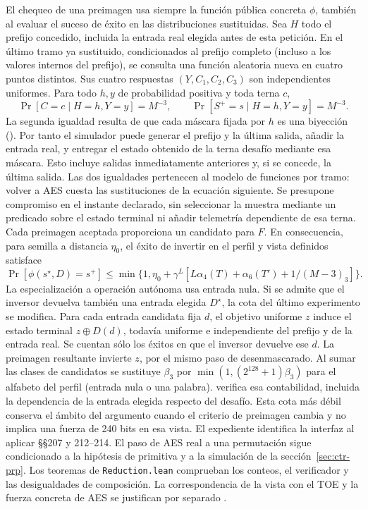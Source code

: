 El chequeo de una preimagen usa siempre la función pública concreta
\(\phi\), también al evaluar el suceso de éxito en las distribuciones
sustituidas. Sea \(H\) todo el prefijo concedido, incluida la entrada real
elegida antes de esta petición. En el último tramo ya sustituido,
condicionados al prefijo completo (incluso a los valores internos del
prefijo), se consulta una función aleatoria nueva en cuatro puntos
distintos. Sus cuatro respuestas \((Y,C_1,C_2,C_3)\) son independientes
uniformes. Para todo \(h,y\) de probabilidad positiva y toda terna \(c\),
\[
 \Pr[C=c\mid H=h,Y=y]=M^{-3},\qquad
 \Pr[S^+=s\mid H=h,Y=y]=M^{-3}.
\]
La segunda igualdad resulta de que cada máscara fijada por \(h\) es una
biyección (). Por tanto el simulador puede
generar el prefijo y la última salida, añadir la entrada real, y entregar el
estado obtenido de la terna desafío mediante esa máscara. Esto incluye
salidas inmediatamente anteriores y, si se concede, la última salida. Las
dos igualdades pertenecen al modelo de funciones por tramo: volver a AES
cuesta las sustituciones de la ecuación siguiente. Se presupone compromiso
en el instante declarado, sin seleccionar la muestra mediante un predicado
sobre el estado terminal ni añadir telemetría dependiente de esa terna.
Cada preimagen aceptada proporciona un candidato para \(F\).
En consecuencia, para semilla a distancia \(\eta_0\), el éxito de
invertir en el perfil y vista definidos satisface
\[
 \Pr[\phi(s^\star,D)=s^+]
 \le \min\{1,\eta_0+\gamma^L[L\alpha_4(T)
                     +\alpha_6(T')+1/(M-3)_3]\}.
\]
La especialización a operación autónoma usa entrada nula. Si se admite que el inversor devuelva también una entrada elegida
\(D^\star\), la cota del último experimento se modifica. Para cada entrada
candidata fija \(d\), el objetivo uniforme \(z\) induce el estado terminal
\(z\oplus D(d)\), todavía uniforme e independiente del prefijo y de la
entrada real. Se cuentan sólo los éxitos en que el inversor devuelve
ese \(d\). La preimagen resultante invierte \(z\), por el mismo paso de
desenmascarado. Al sumar las clases de candidatos se sustituye
\(\beta_3\) por \(\min(1,(2^{128}+1)\beta_3)\) para el alfabeto del perfil
(entrada nula o una palabra).  verifica esa
contabilidad, incluida la dependencia de la entrada elegida respecto del
desafío. Esta cota más débil conserva el ámbito del argumento cuando el
criterio de preimagen cambia y no implica una fuerza de 240 bits en esa
vista. El expediente identifica la interfaz al aplicar §§207 y 212--214. El paso de AES real a una permutación
sigue condicionado a la hipótesis de primitiva y a la simulación de la
sección~\ref{sec:ctr-prp}. Los teoremas de \texttt{Reduction.lean} comprueban
los conteos, el verificador y las desigualdades de composición. La
correspondencia de la vista con el TOE y la fuerza concreta de AES se
justifican por separado \cite[§§207, 212--214 y 1007]{ais}.
